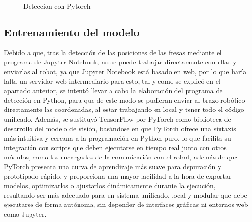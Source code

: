   \begin{figure}[H]
    \begin{center}
      \subcapcentertrue
      \hspace{2mm}
    \end{center}
    \caption{Deteccion con Pytorch}
    \label{fig:Deteccion_Pytorch}
  \end{figure}
  
\subsection{Entrenamiento del modelo}
\label{sec:entrenamiento_modelo_Pytorch_Python}


Debido a que, tras la detección de las posiciones de las fresas mediante el programa de Jupyter Notebook, no se puede trabajar directamente con ellas y enviarlas al robot, ya que Jupyter Notebook está basado en web, por lo que haría falta un servidor web intermediario para esto, tal y como se explicó en el apartado anterior, se intentó llevar a cabo la elaboración del programa de detección en Python, para que de este modo se pudieran enviar al brazo robótico directamente las coordenadas, al estar trabajando en local y tener todo el código unificado. Además, se sustituyó TensorFlow por PyTorch como biblioteca de desarrollo del modelo de visión, basándose en que PyTorch ofrece una sintaxis más intuitiva y cercana a la programación en Python puro, lo que facilita su integración con scripts que deben ejecutarse en tiempo real junto con otros módulos, como los encargados de la comunicación con el robot, además de que PyTorch presenta una curva de aprendizaje más suave para depuración y prototipado rápido, y proporciona una mayor facilidad a la hora de exportar modelos, optimizarlos o ajustarlos dinámicamente durante la ejecución, resultando ser más adecuado para un sistema unificado, local y modular que debe ejecutarse de forma autónoma, sin depender de interfaces gráficas ni entornos web como Jupyter.\\

